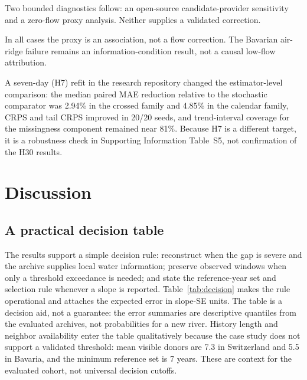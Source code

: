 Two bounded diagnostics follow: an open-source candidate-provider sensitivity and a zero-flow proxy analysis. Neither supplies a validated correction.


In all cases the proxy is an association, not a flow correction. The Bavarian air-ridge failure remains an information-condition result, not a causal low-flow attribution.

A seven-day (H7) refit in the research repository changed the estimator-level comparison: the median paired MAE reduction relative to the stochastic comparator was 2.94\% in the crossed family and 4.85\% in the calendar family, CRPS and tail CRPS improved in 20/20 seeds, and trend-interval coverage for the missingness component remained near 81\%. Because H7 is a different target, it is a robustness check in Supporting Information Table~S5, not confirmation of the $\mathrm{H30}$ results.

\section{Discussion}

\subsection{A practical decision table}

The results support a simple decision rule: reconstruct when the gap is severe and the archive supplies local water information; preserve observed windows when only a threshold exceedance is needed; and state the reference-year set and selection rule whenever a slope is reported. Table~\ref{tab:decision} makes the rule operational and attaches the expected error in slope-SE units. The table is a decision aid, not a guarantee: the error summaries are descriptive quantiles from the evaluated archives, not probabilities for a new river. History length and neighbor availability enter the table qualitatively because the case study does not support a validated threshold: mean visible donors are 7.3 in Switzerland and 5.5 in Bavaria, and the minimum reference set is 7 years. These are context for the evaluated cohort, not universal decision cutoffs.



